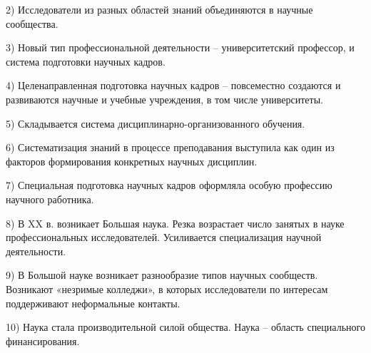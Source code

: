 \documentclass[exam_answers.tex]{subfiles}
\begin{document}
2) Исследователи из разных областей знаний объединяются в научные сообщества.

3) Новый тип профессиональной деятельности – университетский профессор, и система подготовки научных кадров.

4) Целенаправленная подготовка научных кадров – повсеместно создаются и развиваются научные и учебные учреждения, в том числе университеты.

5) Складывается система дисциплинарно-организованного обучения.

6) Систематизация знаний в процессе преподавания выступила как один из факторов формирования конкретных научных дисциплин.

7) Специальная подготовка научных кадров оформляла особую профессию научного работника.

8) В XX в. возникает Большая наука. Резка возрастает число занятых в науке профессиональных исследователей. Усиливается специализация научной деятельности.

9) В Большой науке возникает разнообразие типов научных сообществ. Возникают «незримые колледжи», в которых исследователи по интересам поддерживают неформальные контакты.

10) Наука стала производительной силой общества. Наука – область специального финансирования.
\end{document}
